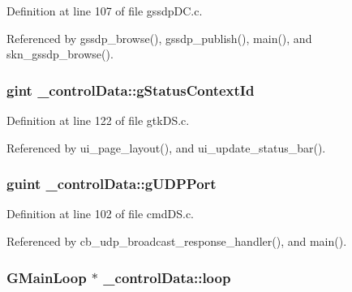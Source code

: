 Definition at line 107 of file gssdp\+D\+C.\+c.



Referenced by gssdp\+\_\+browse(), gssdp\+\_\+publish(), main(), and skn\+\_\+gssdp\+\_\+browse().

\hypertarget{struct__control_data_aae36ce9466663c5765139bb92e9f8d49}{
\subsubsection[{g\+Status\+Context\+Id}]{\setlength{\rightskip}{0pt plus 5cm}gint \+\_\+control\+Data\+::g\+Status\+Context\+Id}}\label{struct__control_data_aae36ce9466663c5765139bb92e9f8d49}


Definition at line 122 of file gtk\+D\+S.\+c.



Referenced by ui\+\_\+page\+\_\+layout(), and ui\+\_\+update\+\_\+status\+\_\+bar().

\hypertarget{struct__control_data_a78b36762a9d85d027fc5e41576ade4f7}{
\subsubsection[{g\+U\+D\+P\+Port}]{\setlength{\rightskip}{0pt plus 5cm}guint \+\_\+control\+Data\+::g\+U\+D\+P\+Port}}\label{struct__control_data_a78b36762a9d85d027fc5e41576ade4f7}


Definition at line 102 of file cmd\+D\+S.\+c.



Referenced by cb\+\_\+udp\+\_\+broadcast\+\_\+response\+\_\+handler(), and main().

\hypertarget{struct__control_data_ae1b70bafbd5eb568c6ca339664959216}{
\subsubsection[{loop}]{\setlength{\rightskip}{0pt plus 5cm}G\+Main\+Loop $\ast$ \+\_\+control\+Data\+::loop}}\label{struct__control_data_ae1b70bafbd5eb568c6ca339664959216}



